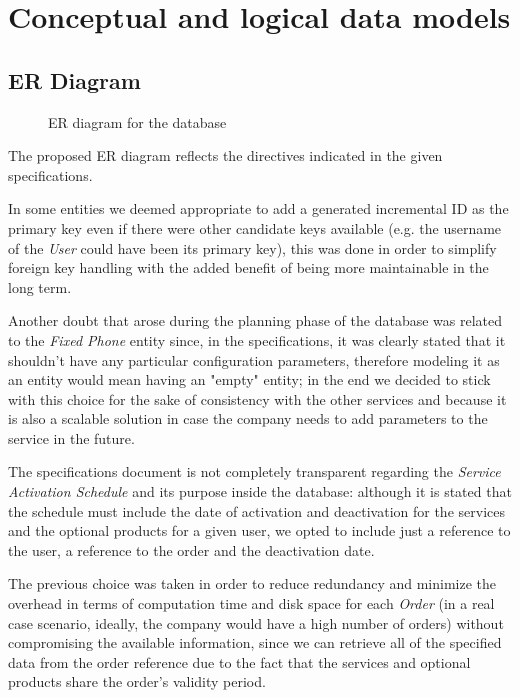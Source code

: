 
\chapter{Conceptual and logical data models}
\label{chap:data_models}


\section{ER Diagram}
\label{sec:er_diagram}

\begin{figure}[h]
    \centering
    \centerline{}
    \caption{ER diagram for the database}
    \label{fig:er_diagram}
\end{figure}

The proposed ER diagram reflects the directives indicated in the given specifications.

In some entities we deemed appropriate to add a generated incremental ID as the primary key even if there were other candidate keys available (e.g. the username of the \textit{User} could have been its primary key), this was done in order to simplify foreign key handling with the added benefit of being more maintainable in the long term.

Another doubt that arose during the planning phase of the database was related to the \textit{Fixed Phone} entity since, in the specifications, it was clearly stated that it shouldn't have any particular configuration parameters, therefore modeling it as an entity would mean having an "empty" entity; in the end we decided to stick with this choice for the sake of consistency with the other services and because it is also a scalable solution in case the company needs to add parameters to the service in the future.

The specifications document is not completely transparent regarding the \textit{Service Activation Schedule} and its purpose inside the database: although it is stated that the schedule must include the date of activation and deactivation for the services and the optional products for a given user, we opted to include just a reference to the user, a reference to the order and the deactivation date.

The previous choice was taken in order to reduce redundancy and minimize the overhead in terms of computation time and disk space for each \textit{Order} (in a real case scenario, ideally, the company would have a high number of orders) without compromising the available information, since we can retrieve all of the specified data from the order reference due to the fact that the services and optional products share the order's validity period.

